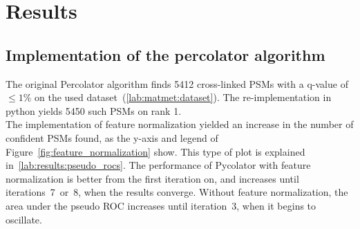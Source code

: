 \chapter{Results}
\label{results}


\section{Implementation of the percolator algorithm}
The original Percolator algorithm finds 5412 cross-linked PSMs with a q-value of $\leq1\%$ on the used dataset~(\ref{lab:matmet:dataset}). The re-implementation in python yields 5450 such PSMs on rank 1.\\
The implementation of feature normalization yielded an increase in the number of confident PSMs found, as the y-axis and legend of Figure~\ref{fig:feature_normalization} show. This type of plot is explained in~\autoref{lab:results:pseudo_rocs}. The performance of Pycolator with feature normalization is better from the first iteration on, and increases until iterations~7~or~8, when the results converge. Without feature normalization, the area under the pseudo ROC increases until iteration~3, when it begins to oscillate. \\
\renewcommand{\baselinestretch}{0.9}
